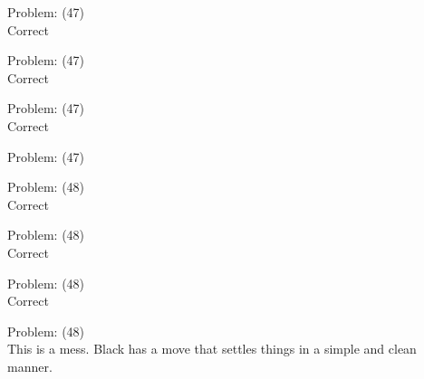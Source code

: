 \documentclass[11pt]{article}
\begin{document}
\begin{minipage}[t]{0.5\textwidth}
  {\centering
  
Problem: (47)\\
Correct\\
  }
\end{minipage}
\begin{minipage}[t]{0.5\textwidth}
  {\centering
  
Problem: (47)\\
Correct\\
  }
\end{minipage}
\begin{minipage}[t]{0.5\textwidth}
  {\centering
  
Problem: (47)\\
Correct\\
  }
\end{minipage}
\begin{minipage}[t]{0.5\textwidth}
  {\centering
  
Problem: (47)\\
  }
\end{minipage}
\begin{minipage}[t]{0.5\textwidth}
  {\centering
  
Problem: (48)\\
Correct\\
  }
\end{minipage}
\begin{minipage}[t]{0.5\textwidth}
  {\centering
  
Problem: (48)\\
Correct\\
  }
\end{minipage}
\begin{minipage}[t]{0.5\textwidth}
  {\centering
  
Problem: (48)\\
Correct\\
  }
\end{minipage}
\begin{minipage}[t]{0.5\textwidth}
  {\centering
  
Problem: (48)\\
This is a mess. Black has a move that settles things in a simple and clean manner.\\
  }
\end{minipage}
\end{document}
